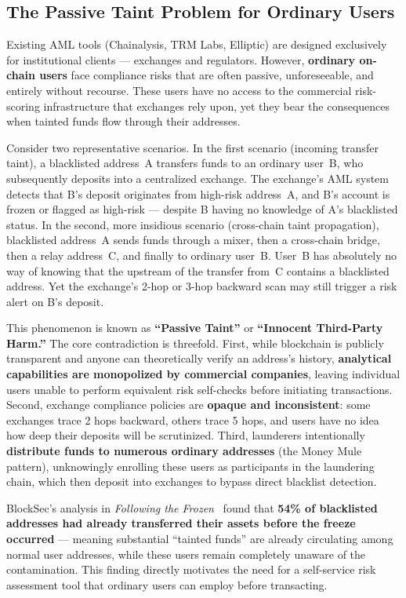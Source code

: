 \documentclass[12pt,a4paper]{article}
\begin{document}
\subsection{The Passive Taint Problem for Ordinary Users}

Existing AML tools (Chainalysis, TRM Labs, Elliptic) are designed exclusively for institutional clients --- exchanges and regulators. However, \textbf{ordinary on-chain users} face compliance risks that are often passive, unforeseeable, and entirely without recourse. These users have no access to the commercial risk-scoring infrastructure that exchanges rely upon, yet they bear the consequences when tainted funds flow through their addresses.

Consider two representative scenarios. In the first scenario (incoming transfer taint), a blacklisted address~A transfers funds to an ordinary user~B, who subsequently deposits into a centralized exchange. The exchange's AML system detects that B's deposit originates from high-risk address~A, and B's account is frozen or flagged as high-risk --- despite B having no knowledge of A's blacklisted status. In the second, more insidious scenario (cross-chain taint propagation), blacklisted address~A sends funds through a mixer, then a cross-chain bridge, then a relay address~C, and finally to ordinary user~B. User~B has absolutely no way of knowing that the upstream of the transfer from~C contains a blacklisted address. Yet the exchange's 2-hop or 3-hop backward scan may still trigger a risk alert on B's deposit.

This phenomenon is known as \textbf{``Passive Taint''} or \textbf{``Innocent Third-Party Harm.''} The core contradiction is threefold. First, while blockchain is publicly transparent and anyone can theoretically verify an address's history, \textbf{analytical capabilities are monopolized by commercial companies}, leaving individual users unable to perform equivalent risk self-checks before initiating transactions. Second, exchange compliance policies are \textbf{opaque and inconsistent}: some exchanges trace 2 hops backward, others trace 5 hops, and users have no idea how deep their deposits will be scrutinized. Third, launderers intentionally \textbf{distribute funds to numerous ordinary addresses} (the Money Mule pattern), unknowingly enrolling these users as participants in the laundering chain, which then deposit into exchanges to bypass direct blacklist detection.

BlockSec's analysis in \textit{Following the Frozen}~\cite{blocksec2023} found that \textbf{54\% of blacklisted addresses had already transferred their assets before the freeze occurred} --- meaning substantial ``tainted funds'' are already circulating among normal user addresses, while these users remain completely unaware of the contamination. This finding directly motivates the need for a self-service risk assessment tool that ordinary users can employ before transacting.
\end{document}
